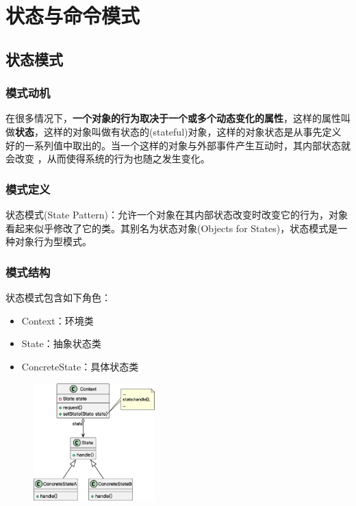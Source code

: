\section{状态与命令模式}

\subsection{状态模式}

\subsubsection{模式动机}
在很多情况下，\textbf{一个对象的行为取决于一个或多个动态变化的属性}，这样的属性叫做\textbf{状态}，这样的对象叫做有状态的(stateful)对象，这样的对象状态是从事先定义好的一系列值中取出的。当一个这样的对象与外部事件产生互动时，其内部状态就会改变 ，从而使得系统的行为也随之发生变化。

\subsubsection{模式定义}
状态模式(State Pattern)：允许一个对象在其内部状态改变时改变它的行为，对象看起来似乎修改了它的类。其别名为状态对象(Objects for States)，状态模式是一种对象行为型模式。

\subsubsection{模式结构}
状态模式包含如下角色：
\vspace{-0.8em}
\begin{multicols}{3}
    \begin{itemize}
        \item Context：环境类
        \item State：抽象状态类
        \item ConcreteState：具体状态类
    \end{itemize}
\end{multicols}
\vspace{-1em}

\begin{figure}[H]
    \vspace{-0.5em}
	\centering
	\includegraphics[width=0.42\textwidth]{images/状态模式结构.eps}
    \vspace{-1em}
\end{figure}

